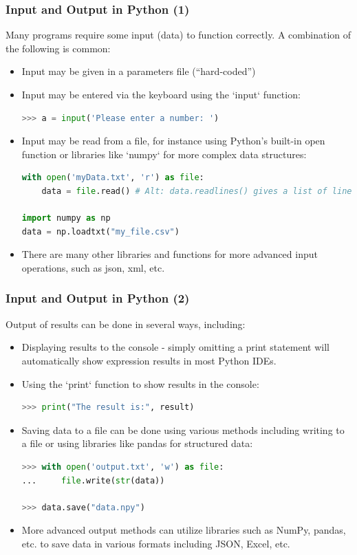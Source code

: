 \begin{frame}[fragile]
  \frametitle{Input and Output in Python (1)}
  Many programs require some input (data) to function correctly. A combination of the following is common:
  \begin{itemize}[<+->]
    \item Input may be given in a parameters file (``hard-coded'')
    \item Input may be entered via the keyboard using the `input` function:
    \begin{lstlisting}[language=Python,numbers=none]
>>> a = input('Please enter a number: ')
    \end{lstlisting}
    \item Input may be read from a file, for instance using Python's built-in open function or libraries like `numpy` for more complex data structures:
    \begin{lstlisting}[language=Python,numbers=none]
with open('myData.txt', 'r') as file:
    data = file.read() # Alt: data.readlines() gives a list of lines

import numpy as np
data = np.loadtxt("my_file.csv")
    \end{lstlisting}
    \item There are many other libraries and functions for more advanced input operations, such as json, xml, etc.
  \end{itemize}
 \end{frame}

 \begin{frame}[fragile]
  \frametitle{Input and Output in Python (2)}
  Output of results can be done in several ways, including:
  \begin{itemize}[<+->]
    \item Displaying results to the console - simply omitting a print statement will automatically show expression results in most Python IDEs.
    \item Using the `print` function to show results in the console:
    \begin{lstlisting}[language=Python,numbers=none]
>>> print("The result is:", result)
    \end{lstlisting}
    \item Saving data to a file can be done using various methods including writing to a file or using libraries like pandas for structured data:
    \begin{lstlisting}[language=Python,numbers=none]
>>> with open('output.txt', 'w') as file:
...     file.write(str(data))

>>> data.save("data.npy")
    \end{lstlisting}
    \item More advanced output methods can utilize libraries such as NumPy, pandas, etc. to save data in various formats including JSON, Excel, etc.
  \end{itemize}
 \end{frame}

